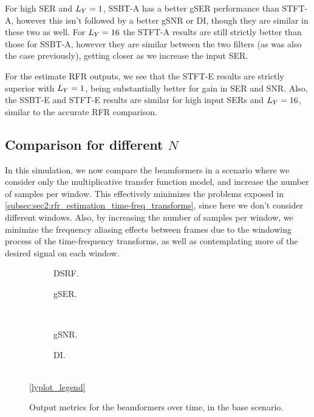 For high SER and $\Ly = 1$, SSBT-A has a better gSER performance than STFT-A, however this isn't followed by a better gSNR or DI, though they are similar in these two as well. For $\Ly = 16$ the STFT-A results are still strictly better than those for SSBT-A, however they are similar between the two filters (as was also the case previously), getting closer as we increase the input SER.

For the estimate RFR outputs, we see that the STFT-E results are strictly superior with $\Ly = 1$, being substantially better for gain in SER and SNR. Also, the SSBT-E and STFT-E results are similar for high input SERs and $\Ly = 16$, similar to the accurate RFR comparison.


\subsection{Comparison for different $N$}

In this simulation, we now compare the beamformers in a scenario where we consider only the multiplicative transfer function model, and increase the number of samples per window. This effectively minimizes the problems exposed in \cref{subsec:sec2:rfr_estimation_time-freq_transforms}, since here we don't consider different windows. Also, by increasing the number of samples per window, we minimize the frequency aliasing effects between frames due to the windowing process of the time-frequency transforms, as well as contemplating more of the desired signal on each window.
\begin{figure}[!ht]
	\centering
	\begin{subfigure}{0.49\textwidth}
		\centering
		
		\caption{DSRF.}
		\label{subfig:lineplot__DSRF__N_var__iSER_n15__Ly_1}
	\end{subfigure}\hfill
	\begin{subfigure}{0.49\textwidth}
		\centering
		
		\caption{gSER.}
		\label{subfig:lineplot__gSER__N_var__iSER_n15__Ly_1}
	\end{subfigure}\\[1em]
	\begin{subfigure}{0.49\textwidth}
		\centering
		
		\caption{gSNR.}
		\label{subfig:lineplot__gSNR__N_var__iSER_n15__Ly_1}
	\end{subfigure}\hfill
	\begin{subfigure}{0.49\textwidth}
		\centering
		
		\caption{DI.}
		\label{subfig:lineplot__DI__N_var__iSER_n15__Ly_1}
	\end{subfigure}\\[1em]
	\ref*{lyplot_legend}
	\caption{Output metrics for the beamformers over time, in the base scenario.}
	\label{fig:lineplot__N_var__iSER_n15__Ly_1}
\end{figure}

